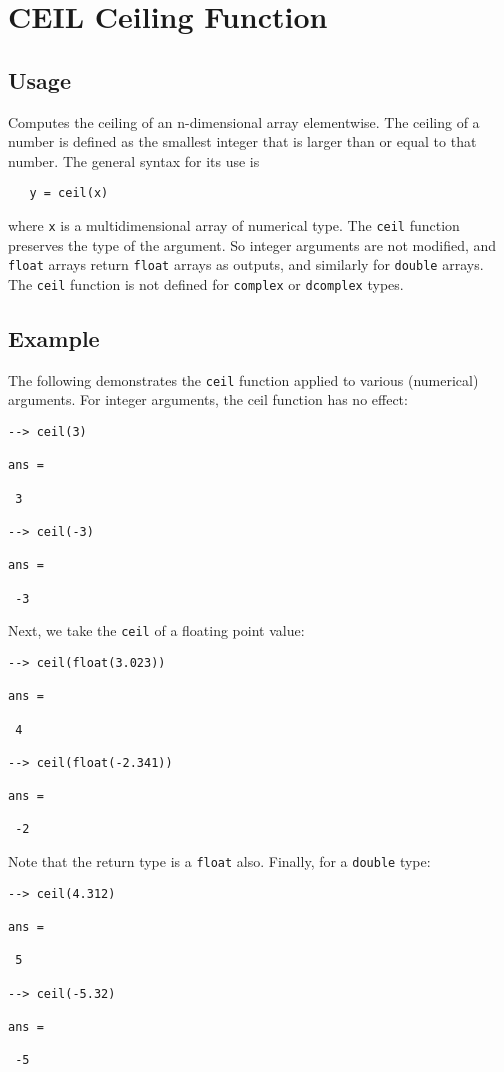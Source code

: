 \section{CEIL Ceiling Function}

\subsection{Usage}

Computes the ceiling of an n-dimensional array elementwise.  The
ceiling of a number is defined as the smallest integer that is
larger than or equal to that number. The general syntax for its use
is
\begin{verbatim}
   y = ceil(x)
\end{verbatim}
where \verb|x| is a multidimensional array of numerical type.  The \verb|ceil| 
function preserves the type of the argument.  So integer arguments 
are not modified, and \verb|float| arrays return \verb|float| arrays as 
outputs, and similarly for \verb|double| arrays.  The \verb|ceil| function 
is not defined for \verb|complex| or \verb|dcomplex| types.
\subsection{Example}

The following demonstrates the \verb|ceil| function applied to various
(numerical) arguments.  For integer arguments, the ceil function has
no effect:
\begin{verbatim}
--> ceil(3)

ans = 

 3 

--> ceil(-3)

ans = 

 -3 
\end{verbatim}
Next, we take the \verb|ceil| of a floating point value:
\begin{verbatim}
--> ceil(float(3.023))

ans = 

 4 

--> ceil(float(-2.341))

ans = 

 -2 
\end{verbatim}
Note that the return type is a \verb|float| also.  Finally, for a \verb|double|
type:
\begin{verbatim}
--> ceil(4.312)

ans = 

 5 

--> ceil(-5.32)

ans = 

 -5 
\end{verbatim}
